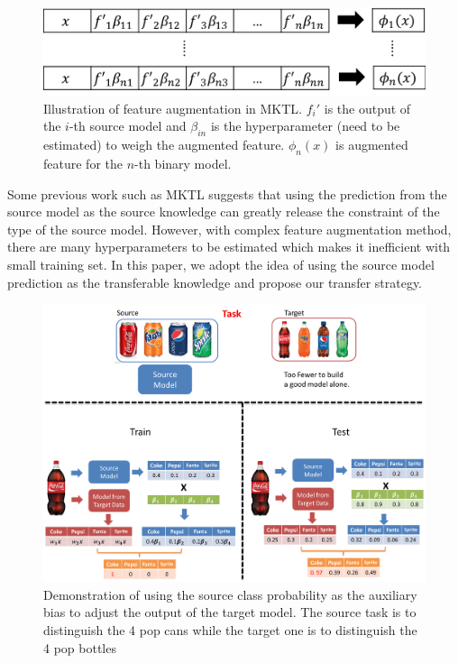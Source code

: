 \begin{figure}
	\centering
	\includegraphics[scale=0.6]{pakdd/fig/mktl.png}
	\caption{Illustration of feature augmentation in MKTL. $f_i'$ is the output of the $i$-th source model and $\beta_{in}$ is the hyperparameter (need to be estimated) to weigh the augmented feature. $\phi_n(x)$ is augmented feature for the $n$-th binary model.}
	\label{fig:mktl}
\end{figure}
Some previous work such as MKTL\cite{jie2011multiclass} suggests that using the prediction from the source model as the source knowledge can greatly release the constraint of the type of the source model. However, with complex feature augmentation method, there are many hyperparameters to be estimated which makes it inefficient with small training set. In this paper, we adopt the idea of using the source model prediction as the transferable knowledge and propose our transfer strategy.


\begin{figure}
	\centering
	\includegraphics[scale=.6]{pakdd/fig/explain.png}
	\caption{Demonstration of using the source class probability as the auxiliary bias to adjust the output of the target model. The source task is to distinguish the 4 pop cans while the target one is to distinguish the 4 pop bottles}
	\label{fig:ab}
\end{figure}

